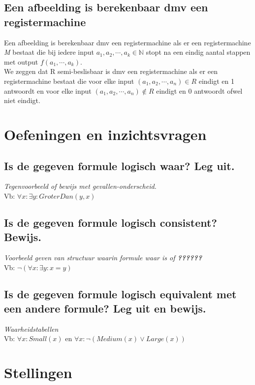 \documentclass[11pt, a4paper]{article}
\begin{document}
\subsection*{Een afbeelding is berekenbaar dmv een registermachine}
Een afbeelding is berekenbaar dmv een registermachine als er een registermachine \textit{M} bestaat die bij iedere input $a_1, a_2, \cdots, a_k \in \mathbb{N}$ stopt na een eindig aantal stappen met output $f(a_1, \cdots, a_k)$.\\
We zeggen dat R semi-beslisbaar is dmv een registermachine als er een registermachine bestaat die voor elke input $(a_1, a_2, \cdots, a_n) \in \textit{R}$ eindigt en 1 antwoordt en voor elke input $(a_1, a_2, \cdots, a_n) \notin \textit{R}$ eindigt en 0 antwoordt ofwel niet eindigt.

\section*{Oefeningen en inzichtsvragen}
\subsection*{Is de gegeven formule logisch waar? Leg uit.}
\textit{Tegenvoorbeeld of bewijs met gevallen-onderscheid.}\\
Vb: $\forall x: \exists y: GroterDan(y,x)$
\vfill

\subsection*{Is de gegeven formule logisch consistent? Bewijs.}
\textit{Voorbeeld geven van structuur waarin formule waar is of \textbf{??????}}\\
Vb: $\neg (\forall x: \exists y: x=y)$
\vfill
\newpage

\subsection*{Is de gegeven formule logisch equivalent met een andere formule? Leg uit en bewijs.}
\textit{Waarheidstabellen}\\
Vb: $\forall x: Small(x)$ en $\forall x: \neg (Medium(x) \lor Large(x))$
\vfill

\section*{Stellingen}
\end{document}
